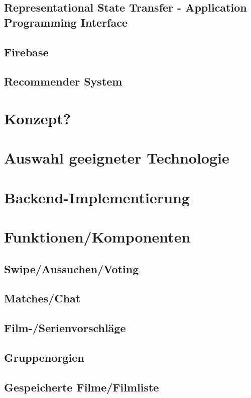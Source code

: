 \documentclass[11pt,a4paper]{article}
\begin{document}
\newpage
\subsection{Representational State Transfer - Application Programming Interface}

\newpage
\subsection{Firebase}

\newpage

\subsection{Recommender System}
	
		
\section{Konzept?}



\section{Auswahl geeigneter Technologie}


\section{Backend-Implementierung}


\section{Funktionen/Komponenten}

\subsection{Swipe/Aussuchen/Voting}		
\subsection{Matches/Chat}		
\subsection{Film-/Serienvorschläge}		
\subsection{Gruppenorgien}		
\subsection{Gespeicherte Filme/Filmliste}		
\end{document}
